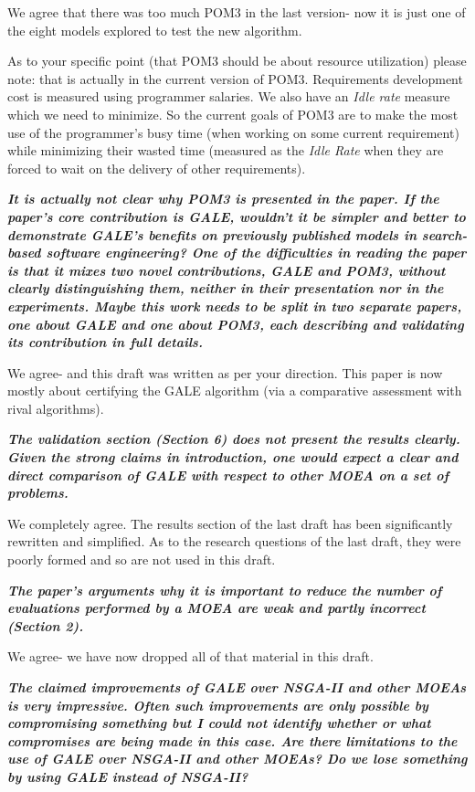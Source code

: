\documentclass[10pt,journal,compsoc]{IEEEtran}
\begin{document}
We agree that there was too much POM3 in the last version- now it is just one of the eight models
explored to test the new algorithm.

As to your specific point (that POM3 should be about resource utilization) please note: that
is actually in the current version of POM3. Requirements development cost is measured using programmer
salaries. We also have an {\em Idle rate} measure which we need to minimize. So the current goals
of POM3 are to make the most use of the programmer's busy time (when working on some current requirement)
while minimizing their wasted time (measured as the {\em Idle Rate} when they are forced to wait
on the delivery of other requirements).


{\bf {\em It is actually not clear why POM3 is presented in the paper. If the paper's core contribution is GALE, wouldn't it be simpler and better to demonstrate GALE's benefits on previously published models in search-based software engineering? One of the difficulties in reading the paper is that it mixes two novel contributions, GALE and POM3, without clearly distinguishing them, neither in their presentation nor in the experiments. Maybe this work needs to be split in two separate papers, one about GALE and one about POM3, each describing and validating its contribution in full details.}}

We agree- and this draft was written as per your direction. This paper is now mostly about certifying
the GALE algorithm (via a comparative assessment with rival algorithms).

{\bf {\em The validation section (Section 6) does not present the results clearly.  Given the strong claims in introduction, one would expect a clear and direct comparison of GALE with respect to other MOEA on a set of problems. }}

We completely agree. The results section of the last draft has been significantly rewritten and simplified.
As to the research questions of the last draft, they were poorly formed and so are not used in this draft.



{\bf {\em The paper's arguments why it is important to reduce the number of evaluations performed by a MOEA are weak and partly incorrect (Section 2).}}

We agree- we have now dropped all of that material in this draft.


{\bf {\em The claimed improvements of GALE over NSGA-II and
other MOEAs is very impressive. Often such
improvements are only possible by compromising
something but I could not identify whether or what
compromises are being made in this case. Are there
limitations to the use of GALE over NSGA-II and other
MOEAs? Do we lose something by using GALE instead of
NSGA-II? }}
\end{document}
